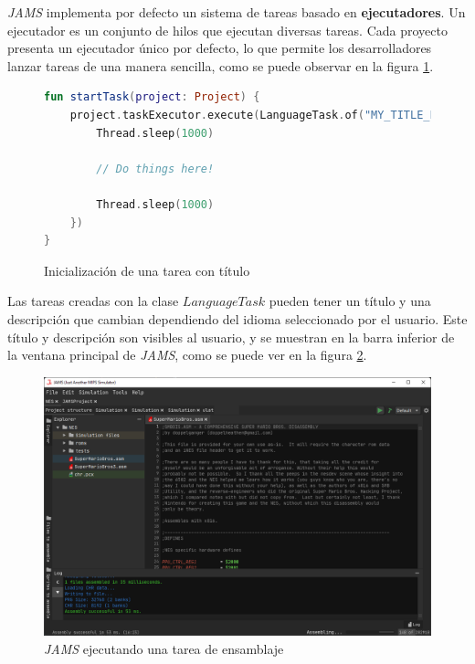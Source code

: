 \noindent \textit{JAMS} implementa por defecto un
sistema de tareas basado en \textbf{ejecutadores}.
Un ejecutador es un conjunto de hilos que ejecutan
diversas tareas.
Cada proyecto presenta un ejecutador único por defecto,
lo que permite los desarrolladores lanzar tareas de una
manera sencilla, como se puede observar en la figura \ref{fig:tasks-execution}.

\begin{figure}[h]
    \centering
    \begin{lstlisting}[frame=single,label={lst:tasks-execution},language=Kotlin]
fun startTask(project: Project) {
    project.taskExecutor.execute(LanguageTask.of("MY_TITLE_LANGUAGE_NODE") {
        Thread.sleep(1000)

        // Do things here!

        Thread.sleep(1000)
    })
}
    \end{lstlisting}
    \caption{Inicialización de una tarea con título}
    \label{fig:tasks-execution}
\end{figure}

\noindent Las tareas creadas con la clase $LanguageTask$
pueden tener un título y una descripción que cambian dependiendo
del idioma seleccionado por el usuario.
Este título y descripción son visibles al usuario, y se muestran
en la barra inferior de la ventana principal de \textit{JAMS},
como se puede ver en la figura \ref{fig:jams-assembling}.

\begin{figure}[h]
    \centering
    \includegraphics[width=\textwidth]{images/tecnologias/jams-assembling}
    \caption{\textit{JAMS} ejecutando una tarea de ensamblaje}
    \label{fig:jams-assembling}
\end{figure}